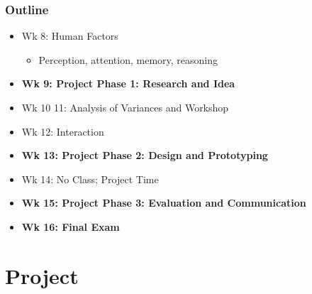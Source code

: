\documentclass{beamer}
\begin{document}
\begin{frame}
	\frametitle{Outline}
	\begin{itemize}
		\item Wk 8: Human Factors
		\begin{itemize}
			\item Perception, attention, memory, reasoning
		\end{itemize}
		\item \textbf{Wk 9: Project Phase 1: Research and Idea}
		\item Wk 10 11: Analysis of Variances and Workshop
		\item Wk 12: Interaction
		\item \textbf{Wk 13: Project Phase 2: Design and Prototyping}
		\item Wk 14: No Class; Project Time
		\item \textbf{Wk 15: Project Phase 3: Evaluation and Communication}
		\item \textbf{Wk 16: Final Exam}
	\end{itemize}
\end{frame}

\section{Project} %
\end{document}
